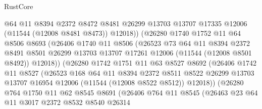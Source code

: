 \begin{lexlean}{RustCore}
\begin{coremodule}
                      @64
                      @11
                      @8394
                      @2372
                      @8472
                      @8481
                      @26299
                      @13703
                      @13707
                      @17335
                      @12006
                      (@11544 (@12008 @8481 @8473))
                      @12018))
                  (@26280
                    @1740
                    @1752
                    @11
                    @64
                    @8506
                    @8693
                    (@26406
                      @1740
                      @11
                      @8506
                      (@26523
                        @73
                        @64
                        @11
                        @8394
                        @2372
                        @8491
                        @8501
                        @26299
                        @13703
                        @13707
                        @17261
                        @12006
                        (@11544 (@12008 @8501 @8492))
                        @12018))
                    (@26280
                      @1742
                      @1751
                      @11
                      @63
                      @8527
                      @8692
                      (@26406
                        @1742
                        @11
                        @8527
                        (@26523
                          @168
                          @64
                          @11
                          @8394
                          @2372
                          @8511
                          @8522
                          @26299
                          @13703
                          @13707
                          @16954
                          @12006
                          (@11544 (@12008 @8522 @8512))
                          @12018))
                      (@26280
                        @764
                        @1750
                        @11
                        @62
                        @8545
                        @8691
                        (@26406
                          @764
                          @11
                          @8545
                          (@26463
                            @23
                            @64
                            @11
                            @3017
                            @2372
                            @8532
                            @8540
                            @26314

\end{coremodule}
\end{lexlean}
